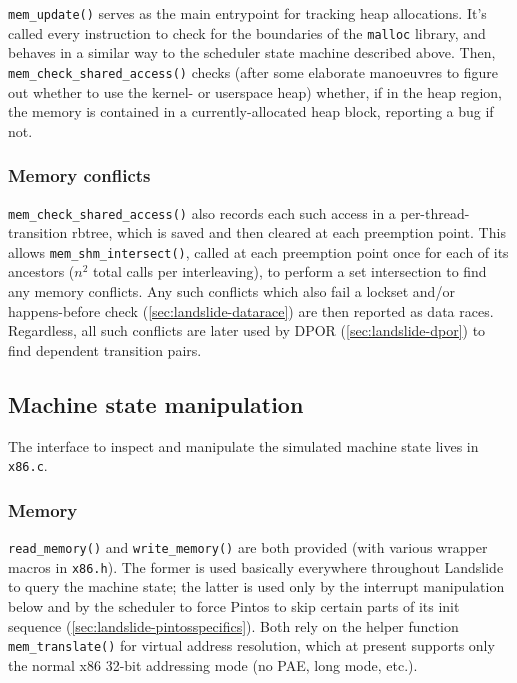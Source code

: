 {\tt mem\_update()} serves as the main entrypoint for tracking heap allocations.
It's called every instruction to check for the boundaries of the {\tt malloc} library,
and behaves in a similar way to the scheduler state machine described above.
Then, {\tt mem\_check\_shared\_access()} checks
(after some elaborate manoeuvres to figure out whether to use the kernel- or userspace heap)
whether, if in the heap region, the memory is contained in a currently-allocated heap block,
reporting a bug if not.

\subsubsection{Memory conflicts}

{\tt mem\_check\_shared\_access()} also records each such access in a per-thread-transition rbtree,
which is saved and then cleared at each preemption point.
This allows {\tt mem\_shm\_\allowbreak{}intersect()}, called at each preemption point once for each of its ancestors
($n^2$ total calls per interleaving),
to perform a set intersection to find any memory conflicts.
Any such conflicts which also fail a lockset
and/or happens-before check (\cref{sec:landslide-datarace})
are then reported as data races.
Regardless, all such conflicts are later used by DPOR (\cref{sec:landslide-dpor}) to find dependent transition pairs.


\subsection{Machine state manipulation}

The interface to inspect and manipulate the simulated machine state lives in {\tt x86.c}.

\subsubsection{Memory}

{\tt read\_memory()} and {\tt write\_memory()} are both provided (with various wrapper macros in {\tt x86.h}).
The former is used basically everywhere throughout Landslide to query the machine state;
the latter is used only by the interrupt manipulation below
and by the scheduler to force Pintos to skip certain parts of its init sequence (\cref{sec:landslide-pintosspecifics}).
Both rely on the helper function {\tt mem\_translate()} for virtual address resolution,
which at present supports only the normal x86 32-bit addressing mode (no PAE, long mode, etc.).

